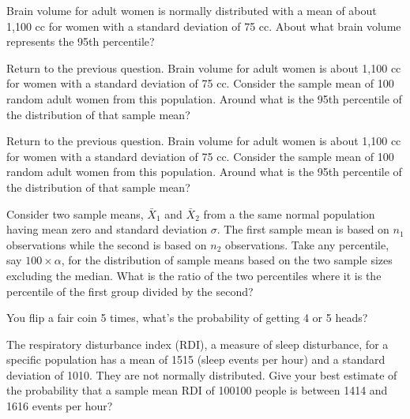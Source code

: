 \documentclass{homework}
\begin{document}
\begin{tcolorbox}[title=Question 8]
Brain volume for adult women is normally distributed with a mean of about 1,100 cc for women with a standard deviation of 75 cc. About what brain volume represents the 95th percentile? 
\end{tcolorbox}

\begin{tcolorbox}[title=Question 9]
Return to the previous question. Brain volume for adult women is about 1,100 cc for women with a standard deviation of 75 cc. Consider the sample mean of 100 random adult women from this population. Around what is the 95th percentile of the distribution of that sample mean?
\end{tcolorbox}

\begin{tcolorbox}[title=Question 10]
Return to the previous question. Brain volume for adult women is about 1,100 cc for women with a standard deviation of 75 cc. Consider the sample mean of 100 random adult women from this population. Around what is the 95th percentile of the distribution of that sample mean?
\end{tcolorbox}

\begin{tcolorbox}[title=Question 11]
Consider two sample means, $\bar X_1$ and $\bar X_2$ from a the same normal population having mean zero and standard deviation $\sigma$.  The first sample mean is based on $n_1$ observations while the second is based on $n_2$ observations. Take any percentile, say $100 \times \alpha$,  for the distribution of sample means based on the two sample sizes excluding the median. What is the ratio of the two percentiles where it is the percentile of the first group divided by the second?
\end{tcolorbox}

\begin{tcolorbox}[title=Question 12]
You flip a fair coin 5 times, what's the probability of getting 4 or 5 heads?
\end{tcolorbox}

\begin{tcolorbox}[title=Question 13]
The respiratory disturbance index (RDI), a measure of sleep disturbance, for a specific population has a mean of 1515 (sleep events per hour) and a standard deviation of 1010. They are not normally distributed. Give your best estimate of the probability that a sample mean RDI of 100100 people is between 1414 and 1616 events per hour?
\end{tcolorbox}
\end{document}

